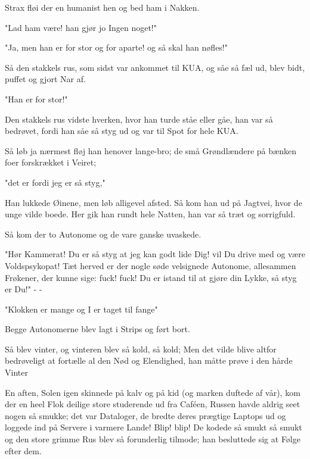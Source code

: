 \documentclass[a4paper,11pt]{article}
\begin{document}
\begin{sketch}
 Strax fløi der en humanist hen og bed ham i Nakken.

 "Lad ham være! han gjør jo Ingen noget!"

 "Ja, men han er for stor og for aparte! og så skal han nøfles!"

 Så den stakkels rus, som sidst var ankommet til KUA, og såe så
fæl ud, blev bidt, puffet og gjort Nar af.

 "Han er for stor!"

 Den stakkels rus vidste hverken, hvor han turde ståe eller
gåe, han var så bedrøvet, fordi han såe så styg ud og var til Spot for 
hele KUA.

 Så løb ja nærmest fløj han henover lange-bro; de små Grøndlændere
på bænken foer forskrækket i Veiret;

 "det er fordi jeg er så styg,"

 Han lukkede Øinene, men løb alligevel afsted. Så kom han ud på
Jagtvei, hvor de unge vilde boede. Her gik han rundt hele Natten, han
var så træt og sorrigfuld.


 Så kom der to Autonome og de vare ganske uvaskede.

 "Hør Kammerat! Du er så styg at jeg kan godt lide Dig! vil Du
drive med og være Voldspsykopat! Tæt herved er der nogle
søde velsignede Autonome, allesammen Frøkener, der kunne sige: fuck!
fuck! Du er istand til at gjøre din Lykke, så styg er Du!" - -

 "Klokken er mange og I er taget til fange"

 Begge Autonomerne blev lagt i Strips og ført bort. 

 Så blev vinter, og vinteren blev så kold, så kold; 
Men det vilde blive altfor bedrøveligt at fortælle al den Nød 
og Elendighed, han måtte prøve i den hårde Vinter 


 En aften, Solen igen skinnede på kalv og på kid (og marken
duftede af vår), kom der en heel Flok deilige store studerende ud fra
Caféen, Russen havde aldrig seet nogen så smukke; det var Dataloger,
de bredte deres prægtige Laptops ud og loggede ind på Servere i varmere Lande! 
 Blip! blip!
 De kodede så smukt så smukt og den store grimme Rus blev så
forunderlig tilmode; han besluttede sig at Følge efter dem.


\end{sketch}
\end{document}
